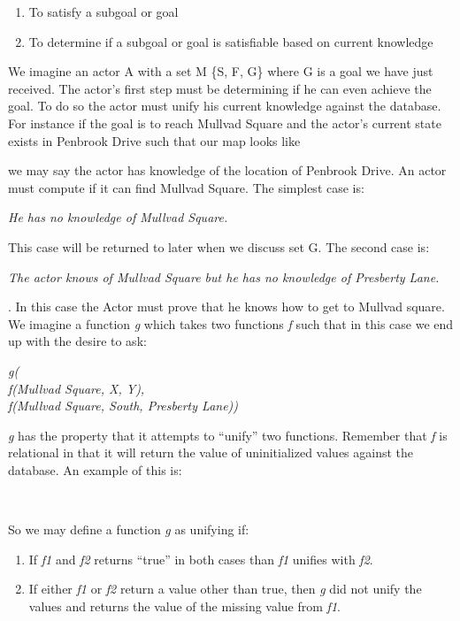\documentclass[11pt,twocolumn]{article}
\begin{document}
  \begin{enumerate}
  \item To satisfy a subgoal or goal
  \item To determine if a subgoal or goal is satisfiable based on current knowledge
  \end{enumerate}
  We imagine an actor A with a set M \{S, F, G\} where G is a goal we have just received.  The actor's first step must be determining if he can even achieve the goal.  To do so the actor must unify his current knowledge against the database.  For instance if the goal is to reach Mullvad Square and the actor's current state exists in Penbrook Drive such that our map looks like \begin{displayquote}
     \center{\downarrow \uparrow}  \center{\downarrow \uparrow} \end{displayquote}
  we may say the actor has knowledge of the location of Penbrook Drive.  An actor must compute if it can find Mullvad Square.  The simplest case is:\begin{displayquote}\textit{He has no knowledge of Mullvad Square.}\end{displayquote} This case will be returned to later when we discuss set G.  
The second case is: \begin{displayquote}\textit{The actor knows of Mullvad Square but he has no knowledge of Presberty Lane.}\end{displayquote}.
In this case the Actor must prove that he knows how to get to Mullvad square.  We imagine a function \textit{g} which takes two functions \textit{f} such that in this case we end up with the desire to ask:\begin{displayquote}\textit{g(\\ f(Mullvad Square, X, Y),\\\quad f(Mullvad Square, South, Presberty Lane))}\end{displayquote}
\textit{g} has the property that it attempts to ``unify'' two functions.  Remember that \textit{f} is relational in that it will return the value of uninitialized values against the database. An example of this is: \begin{displayquote}\center{\downarrow}\\ \end{displayquote}
So we may define a function \textit{g} as unifying if:\begin{enumerate}
\item If \textit{f1} and \textit{f2} returns ``true'' in both cases than \textit{f1} unifies with \textit{f2}.
\item If either \textit{f1} or \textit{f2} return a value other than true, then \textit{g} did not unify the values and returns the value of the missing value from \textit{f1}.
\end{enumerate}
\end{document}
